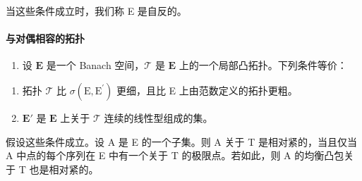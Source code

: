 当这些条件成立时，我们称 E 是自反的。

\paragraph{与对偶相容的拓扑}

\begin{enumerate}
\def\labelenumi{\arabic{enumi})}
\setcounter{enumi}{22}
\tightlist
\item
  设 \(\mathbf{E}\) 是一个 Banach 空间，\(\mathcal{T}\) 是 \(\mathbf{E}\) 上的一个局部凸拓扑。下列条件等价：
\end{enumerate}

\begin{enumerate}
\def\labelenumi{(\roman{enumi})}
\item
  拓扑 \(\mathcal{T}\) 比 \(\sigma (\mathrm{E},\mathrm{E}^{\prime})\) 更细，且比 E 上由范数定义的拓扑更粗。
\item
  \(\mathbf{E}'\) 是 \(\mathbf{E}\) 上关于 \(\mathcal{T}\) 连续的线性型组成的集。
\end{enumerate}

假设这些条件成立。设 A 是 E 的一个子集。则 A 关于 T 是相对紧的，当且仅当 A 中点的每个序列在 E 中有一个关于 T 的极限点。若如此，则 A 的均衡凸包关于 T 也是相对紧的。

